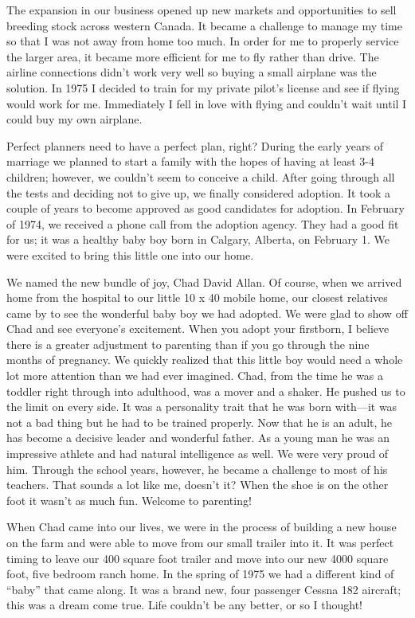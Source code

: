 \documentclass[twoside, 12pt]{book}
\begin{document}
The expansion in our business opened up new markets and opportunities to sell breeding stock across western Canada. It became a challenge to manage my time so that I was not away from home too much. In order for me to properly service the larger area, it became more efficient for me to fly rather than drive. The airline connections didn’t work very well so buying a small airplane was the solution. In 1975 I decided to train for my private pilot's license and see if flying would work for me. Immediately I fell in love with flying and couldn't wait until I could buy my own airplane.

Perfect planners need to have a perfect plan, right? During the early years of marriage we planned to start a family with the hopes of having at least 3-4 children; however, we couldn't seem to conceive a child. After going through all the tests and deciding not to give up, we finally considered adoption. It took a couple of years to become approved as good candidates for adoption. In February of 1974, we received a phone call from the adoption agency. They had a good fit for us; it was a healthy baby boy born in Calgary, Alberta, on February 1. We were excited to bring this little one into our home.

We named the new bundle of joy, Chad David Allan. Of course, when we arrived home from the hospital to our little 10 x 40 mobile home, our closest relatives came by to see the wonderful baby boy we had adopted. We were glad to show off Chad and see everyone's excitement. When you adopt your firstborn, I believe there is a greater adjustment to parenting than if you go through the nine months of pregnancy. We quickly realized that this little boy would need a whole lot more attention than we had ever imagined. Chad, from the time he was a toddler right through into adulthood, was a mover and a shaker. He pushed us to the limit on every side. It was a personality trait that he was born with—it was not a bad thing but he had to be trained properly. Now that he is an adult, he has become a decisive leader and wonderful father. As a young man he was an impressive athlete and had natural intelligence as well. We were very proud of him. Through the school years, however, he became a challenge to most of his teachers. That sounds a lot like me, doesn’t it?  When the shoe is on the other foot it wasn’t as much fun. Welcome to parenting!

When Chad came into our lives, we were in the process of building a new house on the farm and were able to move from our small trailer into it. It was perfect timing to leave our 400 square foot trailer and move into our new 4000 square foot, five bedroom ranch home. In the spring of 1975 we had a different kind of “baby” that came along. It was a brand new, four passenger Cessna 182 aircraft; this was a dream come true. Life couldn't be any better, or so I thought!
\end{document}
